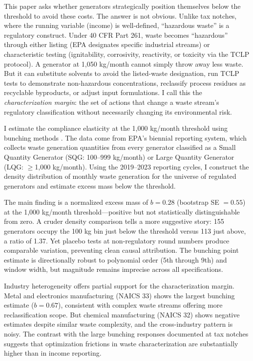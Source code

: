 \documentclass[12pt]{article}
\begin{document}
This paper asks whether generators strategically position themselves below the threshold to avoid these costs. The answer is not obvious. Unlike tax notches, where the running variable (income) is well-defined, ``hazardous waste'' is a regulatory construct. Under 40 CFR Part 261, waste becomes ``hazardous'' through either listing (EPA designates specific industrial streams) or characteristic testing (ignitability, corrosivity, reactivity, or toxicity via the TCLP protocol). A generator at 1,050 kg/month cannot simply throw away less waste. But it can substitute solvents to avoid the listed-waste designation, run TCLP tests to demonstrate non-hazardous concentrations, reclassify process residues as recyclable byproducts, or adjust input formulations. I call this the \textit{characterization margin}: the set of actions that change a waste stream's regulatory classification without necessarily changing its environmental risk.

I estimate the compliance elasticity at the 1,000 kg/month threshold using bunching methods \citep{saez2010, kleven2013, chetty2011}. The data come from EPA's biennial reporting system, which collects waste generation quantities from every generator classified as a Small Quantity Generator (SQG: 100--999 kg/month) or Large Quantity Generator (LQG: $\geq$1,000 kg/month). Using the 2019--2023 reporting cycles, I construct the density distribution of monthly waste generation for the universe of regulated generators and estimate excess mass below the threshold.

The main finding is a normalized excess mass of $b = 0.28$ (bootstrap SE $= 0.55$) at the 1,000 kg/month threshold---positive but not statistically distinguishable from zero. A cruder density comparison tells a more suggestive story: 155 generators occupy the 100 kg bin just below the threshold versus 113 just above, a ratio of 1.37. Yet placebo tests at non-regulatory round numbers produce comparable variation, preventing clean causal attribution. The bunching point estimate is directionally robust to polynomial order (5th through 9th) and window width, but magnitude remains imprecise across all specifications.

Industry heterogeneity offers partial support for the characterization margin. Metal and electronics manufacturing (NAICS 33) shows the largest bunching estimate ($b = 0.67$), consistent with complex waste streams offering more reclassification scope. But chemical manufacturing (NAICS 32) shows negative estimates despite similar waste complexity, and the cross-industry pattern is noisy. The contrast with the large bunching responses documented at tax notches \citep{kleven2013, saez2010} suggests that optimization frictions in waste characterization are substantially higher than in income reporting.
\end{document}

